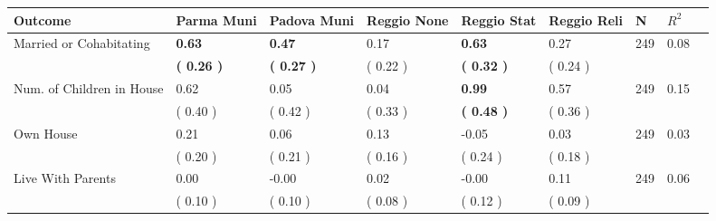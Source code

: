 \begin{tabular}{L{6.2cm} C{1.8cm} C{1.8cm} C{1.8cm} C{1.8cm} C{1.8cm} C{1.8cm} C{0.3cm} C{0.3cm}}
\toprule
 \textbf{Outcome} & \textbf{Parma Muni} & \textbf{Padova Muni} & \textbf{Reggio None} & \textbf{Reggio Stat} & \textbf{Reggio Reli} & \textbf{N} & \textbf{$ R^2$} \\
\midrule
Married or Cohabitating & \textbf{     0.63} & \textbf{     0.47} &      0.17 & \textbf{     0.63} &      0.27  & 249 &       0.08 \\ 
 & \textbf{(     0.26 )} & \textbf{(     0.27 )} & (     0.22 ) & \textbf{(     0.32 )} & (     0.24 )  & \\
Num. of Children in House &      0.62 &      0.05 &      0.04 & \textbf{     0.99} &      0.57  & 249 &       0.15 \\ 
 & (     0.40 ) & (     0.42 ) & (     0.33 ) & \textbf{(     0.48 )} & (     0.36 )  & \\
Own House &      0.21 &      0.06 &      0.13 &     -0.05 &      0.03  & 249 &       0.03 \\ 
 & (     0.20 ) & (     0.21 ) & (     0.16 ) & (     0.24 ) & (     0.18 )  & \\
Live With Parents &      0.00 &     -0.00 &      0.02 &     -0.00 &      0.11  & 249 &       0.06 \\ 
 & (     0.10 ) & (     0.10 ) & (     0.08 ) & (     0.12 ) & (     0.09 )  & \\
\bottomrule
\end{tabular}
